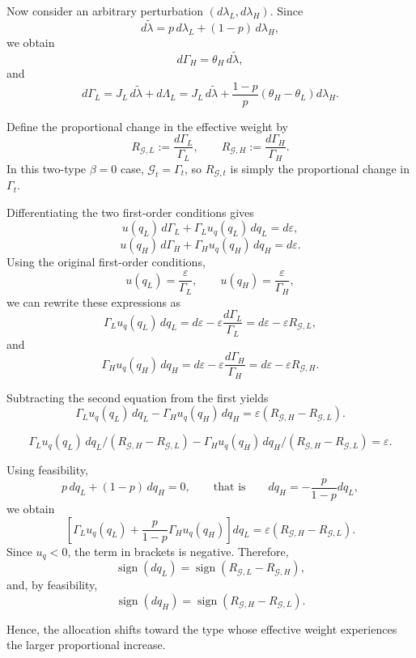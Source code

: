 \documentclass[11pt]{article}
\begin{document}
Now consider an arbitrary perturbation \(\left(d\lambda_L,d\lambda_H\right)\). Since
\[
d\tilde\lambda = p\,d\lambda_L + (1-p)\,d\lambda_H,
\]
we obtain
\[
d\Gamma_H = \theta_H\, d\tilde\lambda,
\]
and
\[
d\Gamma_L
=
J_L\, d\tilde\lambda + d\Lambda_L
=
J_L\, d\tilde\lambda
+
\frac{1-p}{p}\left(\theta_H-\theta_L\right)d\lambda_H.
\]

Define the proportional change in the effective weight by
\[
R_{\mathcal G,L} := \frac{d\Gamma_L}{\Gamma_L},
\qquad
R_{\mathcal G,H} := \frac{d\Gamma_H}{\Gamma_H}.
\]
In this two-type \(\beta=0\) case, \(\mathcal G_t=\Gamma_t\), so \(R_{\mathcal G,t}\) is simply the proportional change in \(\Gamma_t\).

Differentiating the two first-order conditions gives
\[
u(q_L)\,d\Gamma_L + \Gamma_L u_q(q_L)\,dq_L = d\varepsilon,
\]
\[
u(q_H)\,d\Gamma_H + \Gamma_H u_q(q_H)\,dq_H = d\varepsilon.
\]
Using the original first-order conditions,
\[
u(q_L)=\frac{\varepsilon}{\Gamma_L},
\qquad
u(q_H)=\frac{\varepsilon}{\Gamma_H},
\]
we can rewrite these expressions as
\[
\Gamma_L u_q(q_L)\,dq_L
=
d\varepsilon - \varepsilon \frac{d\Gamma_L}{\Gamma_L}
=
d\varepsilon - \varepsilon R_{\mathcal G,L},
\]
and
\[
\Gamma_H u_q(q_H)\,dq_H
=
d\varepsilon - \varepsilon \frac{d\Gamma_H}{\Gamma_H}
=
d\varepsilon - \varepsilon R_{\mathcal G,H}.
\]

Subtracting the second equation from the first yields
\[
\Gamma_L u_q(q_L)\,dq_L
-
\Gamma_H u_q(q_H)\,dq_H
=
\varepsilon\left(R_{\mathcal G,H}-R_{\mathcal G,L}\right).
\]

\[
\Gamma_L u_q(q_L)\,dq_L/\left(R_{\mathcal G,H}-R_{\mathcal G,L}\right)
-
\Gamma_H u_q(q_H)\,dq_H/\left(R_{\mathcal G,H}-R_{\mathcal G,L}\right)
=
\varepsilon.
\]

    Using feasibility,
    \[
    p\,dq_L + (1-p)\,dq_H = 0,
    \qquad\text{that is}\qquad
    dq_H = -\frac{p}{1-p}dq_L,
    \]
    we obtain
    \[
    \left[
    \Gamma_L u_q(q_L)
    +
    \frac{p}{1-p}\Gamma_H u_q(q_H)
    \right]dq_L
    =
    \varepsilon\left(R_{\mathcal G,H}-R_{\mathcal G,L}\right).
    \]
Since \(u_q<0\), the term in brackets is negative. Therefore,
\[
\operatorname{sign}(dq_L)
=
\operatorname{sign}\left(R_{\mathcal G,L}-R_{\mathcal G,H}\right),
\]
and, by feasibility,
\[
\operatorname{sign}(dq_H)
=
\operatorname{sign}\left(R_{\mathcal G,H}-R_{\mathcal G,L}\right).
\]

Hence, the allocation shifts toward the type whose effective weight experiences the larger proportional increase.

\medskip
\end{document}
